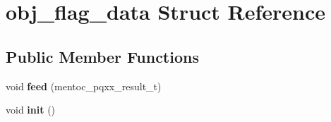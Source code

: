 \hypertarget{structobj__flag__data}{}\section{obj\+\_\+flag\+\_\+data Struct Reference}
\label{structobj__flag__data}
\subsection*{Public Member Functions}
\begin{DoxyCompactItemize}
\item 
\mbox{\label{structobj__flag__data_ab70f7441b7b5c5b6daca10cacb29ab9c}} 
void {\bfseries feed} (mentoc\+\_\+pqxx\+\_\+result\+\_\+t)
\item 
\mbox{\label{structobj__flag__data_a3ac352eb59eb70b55951022940f87bc6}} 
void {\bfseries init} ()
\end{DoxyCompactItemize}

